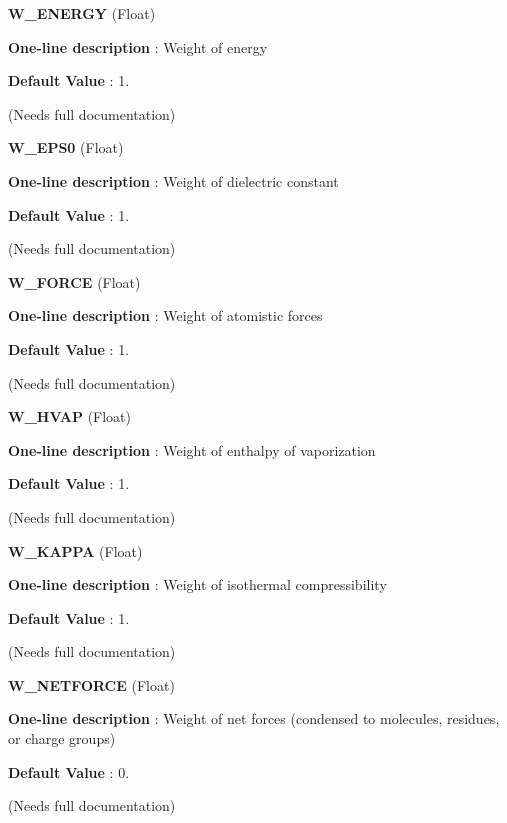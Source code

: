 \begin{DoxyItemize}
\item {\bfseries  W\-\_\-\-E\-N\-E\-R\-G\-Y } (Float) \par
{\bfseries  One-\/line description }\-: Weight of energy \par
{\bfseries  Default Value }\-: 1. \par
(Needs full documentation)\end{DoxyItemize}
\begin{DoxyItemize}
\item {\bfseries  W\-\_\-\-E\-P\-S0 } (Float) \par
{\bfseries  One-\/line description }\-: Weight of dielectric constant \par
{\bfseries  Default Value }\-: 1. \par
(Needs full documentation)\end{DoxyItemize}
\begin{DoxyItemize}
\item {\bfseries  W\-\_\-\-F\-O\-R\-C\-E } (Float) \par
{\bfseries  One-\/line description }\-: Weight of atomistic forces \par
{\bfseries  Default Value }\-: 1. \par
(Needs full documentation)\end{DoxyItemize}
\begin{DoxyItemize}
\item {\bfseries  W\-\_\-\-H\-V\-A\-P } (Float) \par
{\bfseries  One-\/line description }\-: Weight of enthalpy of vaporization \par
{\bfseries  Default Value }\-: 1. \par
(Needs full documentation)\end{DoxyItemize}
\begin{DoxyItemize}
\item {\bfseries  W\-\_\-\-K\-A\-P\-P\-A } (Float) \par
{\bfseries  One-\/line description }\-: Weight of isothermal compressibility \par
{\bfseries  Default Value }\-: 1. \par
(Needs full documentation)\end{DoxyItemize}
\begin{DoxyItemize}
\item {\bfseries  W\-\_\-\-N\-E\-T\-F\-O\-R\-C\-E } (Float) \par
{\bfseries  One-\/line description }\-: Weight of net forces (condensed to molecules, residues, or charge groups) \par
{\bfseries  Default Value }\-: 0. \par
(Needs full documentation)\end{DoxyItemize}
